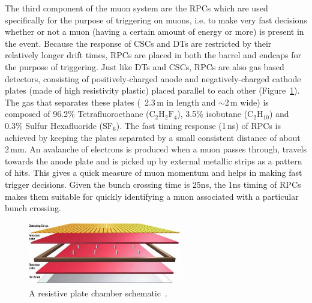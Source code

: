 The third component of the muon system are the RPCs which are used specifically for the purpose of triggering on muons, i.e. to make very fast decisions whether or not a muon (having a certain amount of energy or more) is present in the event. Because the response of CSCs and DTs are restricted by their relatively longer drift times, RPCs are placed in both the barrel and endcaps for the purpose of triggering. Just like DTs and CSCs, RPCs are also gas based detectors, consisting of positively-charged anode and negatively-charged cathode plates (made of high resistivity plastic) placed parallel to each other (Figure~\ref{fig:rpc}). The gas that separates these plates (~2.3\,m in length and $\sim$2\,m wide) is composed of 96.2\% Tetrafluoroethane ($\mathrm{C}_{2}\mathrm{H}_{2}\mathrm{F}_{4}$), 3.5\% isobutane ($\mathrm{C}_{2}\mathrm{H}_{10}$) and 0.3\% Sulfur Hexafluoride ($\mathrm{S}\mathrm{F}_{6}$). The fast timing response (1\,ns) of RPCs is achieved by keeping the plates separated by a small consistent distance of about 2\,mm. An avalanche of electrons is produced  when a muon passes through, travels towards the anode plate and is picked up by external metallic strips as a pattern of hits. This gives a quick measure of muon momentum and helps in making fast trigger decisions. Given the bunch crossing time is 25ns, the 1ns timing of RPCs makes them suitable for quickly identifying a muon associated with a particular bunch crossing.      

\begin{figure}
\begin{center}
  \includegraphics[width=0.6\textwidth,keepaspectratio]{plots_and_figures/chapter3/RPC.jpg}
\caption{A resistive plate chamber schematic~\cite{muon2}.}
\label{fig:rpc}
\end{center}
\end{figure}

